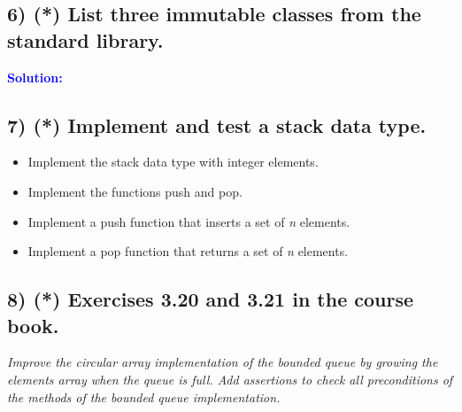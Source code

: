 \documentclass{article}
\begin{document}
\subsection*{6) (*) List three immutable classes from the standard library.}
\indent \textbf{\textcolor{blue}{Solution:}} \\


\subsection*{7) (*) Implement and test a stack data type.}
\begin{itemize}
    \item Implement the stack data type with integer elements.
    \item Implement the functions push and pop.
    \item Implement a push function that inserts a set of \textit{n} elements.
    \item Implement a pop function that returns a set of \textit{n} elements.
\end{itemize}
\subsection*{8) (*) Exercises 3.20 and 3.21 in the course book.}
\textit{Improve the circular array implementation of the
bounded queue by growing the elements array when the queue is full. Add assertions to check
all preconditions of the methods of the bounded queue implementation.}\\

\end{document}
